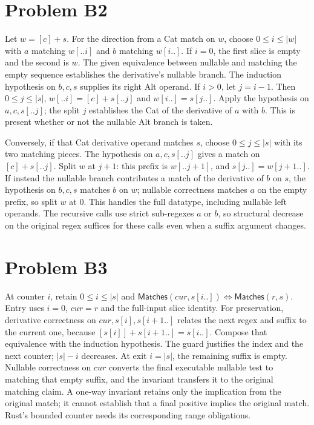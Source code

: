 \documentclass[11pt]{article}
\begin{document}
\section*{Problem B2}\label{ans:B2}
\begin{answer}
Let $w=[c]+s$. For the direction from a Cat match on $w$, choose
$0\leq i\leq |w|$ with $a$ matching $w[..i]$ and $b$ matching $w[i..]$.
If $i=0$, the first slice is empty and the second is $w$. The given equivalence
between nullable and matching the empty sequence establishes the derivative's
nullable branch. The induction hypothesis on $b,c,s$ supplies its right Alt
operand. If $i>0$, let $j=i-1$. Then $0\leq j\leq |s|$,
$w[..i]=[c]+s[..j]$ and $w[i..]=s[j..]$. Apply the hypothesis on $a,c,s[..j]$;
the split $j$ establishes the Cat of the derivative of $a$ with $b$. This is
present whether or not the nullable Alt branch is taken.

Conversely, if that Cat derivative operand matches $s$, choose
$0\leq j\leq |s|$ with its two matching pieces. The hypothesis on $a,c,s[..j]$
gives a match on $[c]+s[..j]$. Split $w$ at $j+1$: this prefix is
$w[..j+1]$, and $s[j..]=w[j+1..]$. If instead the nullable branch contributes
a match of the derivative of $b$ on $s$, the hypothesis on $b,c,s$ matches
$b$ on $w$; nullable correctness matches $a$ on the empty prefix, so split
$w$ at 0. This handles the full datatype, including nullable left operands.
The recursive calls use strict sub-regexes $a$ or $b$, so structural decrease
on the original regex suffices for these calls even when a suffix argument changes.
\end{answer}
\section*{Problem B3}\label{ans:B3}
\begin{answer}
At counter $i$, retain $0\leq i\leq |s|$ and
$\mathsf{Matches}(cur,s[i..])\Longleftrightarrow\mathsf{Matches}(r,s)$.
Entry uses $i=0$, $cur=r$ and the full-input slice identity. For preservation,
derivative correctness on $cur,s[i],s[i+1..]$ relates the next regex and suffix
to the current one, because $[s[i]]+s[i+1..]=s[i..]$. Compose that equivalence
with the induction hypothesis. The guard justifies the index and the next
counter; $|s|-i$ decreases. At exit $i=|s|$, the remaining suffix is empty.
Nullable correctness on $cur$ converts the final executable nullable test to
matching that empty suffix, and the invariant transfers it to the original
matching claim. A one-way invariant retains only the implication from the
original match; it cannot establish that a final positive implies the original
match. Rust's bounded counter needs its corresponding range obligations.
\end{answer}
\end{document}
